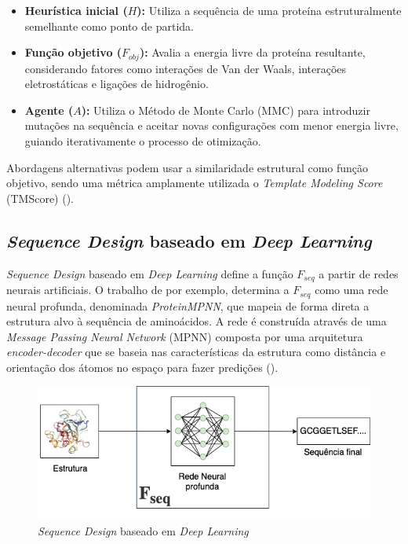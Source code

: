 \begin{itemize}
    \item \textbf{Heurística inicial ($H$):}  
    Utiliza a sequência de uma proteína estruturalmente semelhante como ponto de partida.

    \item \textbf{Função objetivo ($F_{obj}$):}  
    Avalia a energia livre da proteína resultante, considerando fatores como interações de Van der Waals,
    interações eletrostáticas e ligações de hidrogênio.

    \item \textbf{Agente ($A$):}  
    Utiliza o Método de Monte Carlo (MMC) para introduzir mutações na sequência e aceitar novas configurações com menor energia livre,
    guiando iterativamente o processo de otimização.
\end{itemize}

Abordagens alternativas podem usar a similaridade estrutural como função objetivo,
sendo uma métrica amplamente utilizada o \textit{Template Modeling Score} (TMScore) (\cite{tmscore}).

\subsection{\textit{Sequence Design} baseado em \textit{Deep Learning}}
\textit{Sequence Design} baseado em \textit{Deep Learning} define a função $F_{seq}$ 
a partir de redes neurais artificiais. 
O trabalho de \cite{ProteinMPNN} por exemplo, 
determina a $F_{seq}$ como uma rede neural profunda, denominada \textit{ProteinMPNN}, 
que mapeia de forma direta a estrutura alvo à sequência de aminoácidos. 
A rede é construída através de uma \textit{Message Passing Neural Network} (MPNN) 
composta por uma arquitetura \textit{encoder-decoder} 
que se baseia nas características da estrutura como distância e orientação dos átomos no espaço 
para fazer predições (\cite{ProteinMPNN}). 

\begin{figure}[H]
  \centering
  \includegraphics[width=.8\textwidth]{figuras/metodologia-DeepLearningBased.jpg}
  \caption{\textit{Sequence Design} baseado em \textit{Deep Learning}}
\end{figure}


